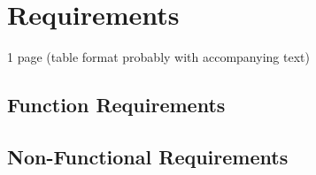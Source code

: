 \documentclass[requirements.tex]{subfiles}
\begin{document}
\section{Requirements} %
\label{sec:requirements}

1 page (table format probably with accompanying text)

\subsection{Function Requirements} %
\label{sub:function_requirements}


\subsection{Non-Functional Requirements} %
\label{sub:non_functional_requirements}


\newpage
\end{document}
